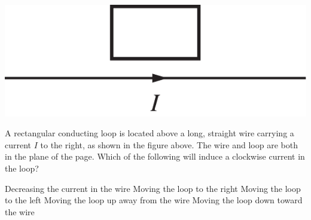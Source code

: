 
\begin{center}
    \includegraphics[scale=0.3]{images/img-016-030.png}
\end{center}

\begin{questions}
\setcounter{question}{33}

\question
A rectangular conducting loop is located above a long, straight wire carrying a current $I$ to the right, as shown in the figure above. The wire and loop are both in the plane of the page. Which of the following will induce a clockwise current in the loop?

\begin{choices}
    \choice Decreasing the current in the wire
    \choice Moving the loop to the right
    \choice Moving the loop to the left
    \choice Moving the loop up away from the wire
    \choice Moving the loop down toward the wire
\end{choices}

\end{questions}
